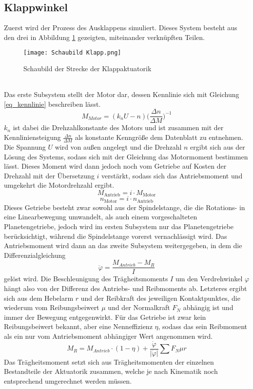 \subsection{Klappwinkel}
Zuerst wird der Prozess des Ausklappens simuliert. Dieses System besteht aus den drei in Abbildung \ref{abb_klappStrecke} gezeigten, miteinander verknüpften Teilen. 
\begin{figure}[h] 
	\centering
	\texttt{[image: Schaubild Klapp.png]}
	\caption{Schaubild der Strecke der Klappaktuatorik}
	\label{abb_klappStrecke}
\end{figure}\\
Das erste Subsystem stellt der Motor dar, dessen Kennlinie sich mit Gleichung \ref{eq_kennlinie} beschreiben lässt.
\begin{equation}\label{eq_kennlinie}
	M_{Motor} = (k_nU-n)\bigg(\frac{\Delta n}{\Delta M}\bigg)^{-1}
\end{equation}
$k_n$ ist dabei die Drehzahlkonstante des Motors und ist zusammen mit der Kennliniensteigung $\frac{\Delta n}{\Delta M}$ als konstante Kenngröße dem Datenblatt zu entnehmen. Die Spannung $U$ wird von außen angelegt und die Drehzahl $n$ ergibt sich aus der Lösung des Systems, sodass sich mit der Gleichung das Motormoment bestimmen lässt. Dieses Moment wird dann jedoch noch vom Getriebe auf Kosten der Drehzahl mit der Übersetzung $i$ verstärkt, sodass sich das Antriebsmoment und umgekehrt die Motordrehzahl ergibt.
\begin{equation}
	M_\mathrm{Antrieb} = i \cdot M_\mathrm{Motor}
\end{equation}
\begin{equation}
	n_\mathrm{Motor} = i \cdot n_\mathrm{Antrieb}
\end{equation}
 Dieses Getriebe besteht zwar sowohl aus der Spindelstange, die die Rotations- in eine Linearbewegung umwandelt, als auch einem vorgeschalteten Planetengetriebe, jedoch wird im ersten Subsystem nur das Planetengetriebe berücksichtigt, während die Spindelstange vorerst vernachlässigt wird. Das Antriebsmoment wird dann an das zweite Subsystem weitergegeben, in dem die Differenzialgleichung
\begin{equation}
	\ddot{\varphi} = \frac{M_{Antrieb} - M_{R}}{I}
\end{equation}
gelöst wird. Die Beschleunigung des Trägheitsmoments $I$ um den Verdrehwinkel $\varphi$ hängt also von der Differenz des Antriebs- und Reibmoments ab. Letzteres ergibt sich aus dem Hebelarm $r$ und der Reibkraft des jeweiligen Kontaktpunktes, die wiederum vom Reibungsbeiwert $\mu$ und der Normalkraft $F_N$ abhängig ist und immer der Bewegung entgegenwirkt. Für das Getriebe ist zwar kein Reibungsbeiwert bekannt, aber eine Nenneffizienz $\eta$, sodass das sein Reibmoment als ein nur vom Antriebsmoment abhängiger Wert angenommen wird.
\begin{equation}\label{eq_reibmoment}
	M_R = M_{Antrieb}\cdot(1-\eta)+\frac{\dot{\varphi}}{|\dot{\varphi}|}\sum F_N \mu r
\end{equation}
Das Trägheitsmoment setzt sich aus Trägheitsmomenten der einzelnen Bestandteile der Aktuatorik zusammen, welche je nach Kinematik noch entsprechend umgerechnet werden müssen.

